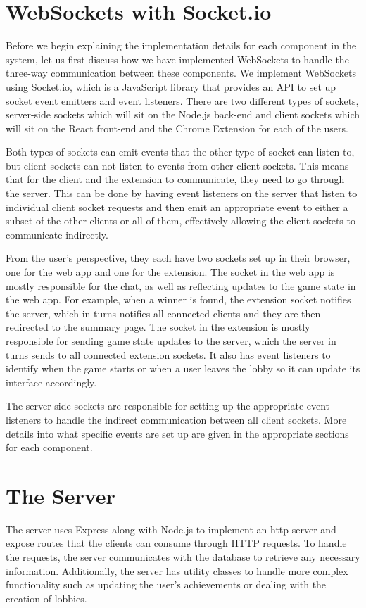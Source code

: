 \documentclass{l4proj}
\begin{document}
\section{WebSockets with Socket.io}
Before we begin explaining the implementation details for each component in the system, let us first discuss how we have implemented WebSockets to handle the three-way communication between these components. We implement WebSockets using Socket.io, which is a JavaScript library that provides an API to set up socket event emitters and event listeners. There are two different types of sockets, server-side sockets which will sit on the Node.js back-end and client sockets which will sit on the React front-end and the Chrome Extension for each of the users. 

Both types of sockets can emit events that the other type of socket can listen to, but client sockets can not listen to events from other client sockets. This means that for the client and the extension to communicate, they need to go through the server. This can be done by having event listeners on the server that listen to individual client socket requests and then emit an appropriate event to either a subset of the other clients or all of them, effectively allowing the client sockets to communicate indirectly.

From the user's perspective, they each have two sockets set up in their browser, one for the web app and one for the extension. The socket in the web app is mostly responsible for the chat, as well as reflecting updates to the game state in the web app. For example, when a winner is found, the extension socket notifies the server, which in turns notifies all connected clients and they are then redirected to the summary page. The socket in the extension is mostly responsible for sending game state updates to the server, which the server in turns sends to all connected extension sockets. It also has event listeners to identify when the game starts or when a user leaves the lobby so it can update its interface accordingly.

The server-side sockets are responsible for setting up the appropriate event listeners to handle the indirect communication between all client sockets. More details into what specific events are set up are given in the appropriate sections for each component.

\section{The Server}
The server uses Express along with Node.js to implement an http server and expose routes that the clients can consume through HTTP requests. To handle the requests, the server communicates with the database to retrieve any necessary information. Additionally, the server has utility classes to handle more complex functionality such as updating the user's achievements or dealing with the creation of lobbies. 
\end{document}
